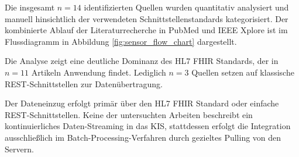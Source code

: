\begin{description}[style=nextline, font=\bfseries]
    Die insgesamt $n = 14$ identifizierten Quellen wurden quantitativ analysiert und manuell hinsichtlich der verwendeten Schnittstellenstandards kategorisiert. Der kombinierte Ablauf der Literaturrecherche in PubMed und IEEE Xplore ist im Flussdiagramm in Abbildung \ref{fig:sensor_flow_chart} dargestellt.

    \item[Ergebnisse] 
    Die Analyse zeigt eine deutliche Dominanz des HL7 FHIR Standards, der in $n = 11$ Artikeln Anwendung findet. Lediglich $n = 3$ Quellen setzen auf klassische REST-Schnittstellen zur Datenübertragung.

    \item[Beantwortung] 
    Der Dateneinzug erfolgt primär über den HL7 FHIR Standard oder einfache REST-Schnittstellen. Keine der untersuchten Arbeiten beschreibt ein kontinuierliches Daten-Streaming in das KIS, stattdessen erfolgt die Integration ausschließlich im Batch-Processing-Verfahren durch gezieltes Pulling von den Servern.

\end{description}

